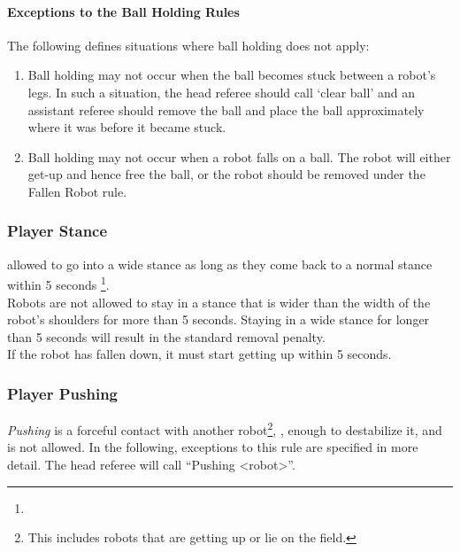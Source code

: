 \paragraph{Exceptions to the Ball Holding Rules}
\label{sec:situations_no_ball_holding}

The following defines situations where ball holding does not apply:

\begin{enumerate}
\item Ball holding may not occur when the ball becomes stuck between a robot's legs.  In such a situation, the head referee should call `clear ball' and an assistant referee should remove the ball and place the ball approximately where it was before it became stuck.
\item Ball holding may not occur when a robot falls on a ball.  The robot will either get-up and hence free the ball, or the robot should be removed under the Fallen Robot rule.
\end{enumerate}

\subsubsection{Player Stance}
\label{sec:player_stance}
 allowed to go into a wide stance as long as they come back to a normal stance within 5 seconds \footnote{}. \\
Robots are not allowed to stay in a stance that is wider than the width of the robot's shoulders for more than 5 seconds. Staying in a wide stance for longer than 5 seconds will result in the standard removal penalty. \\
If the robot has fallen down, it must start getting up within 5 seconds. 

\subsubsection{Player Pushing}
\label{sec:player_pushing}

\emph{Pushing} is a forceful contact with another robot\footnote{This includes robots that are getting up or lie on the field.}, \ie, enough to destabilize it, and is not allowed. In the following, exceptions to this rule are specified in more detail.
The head referee will call ``Pushing \textless robot\textgreater''.

